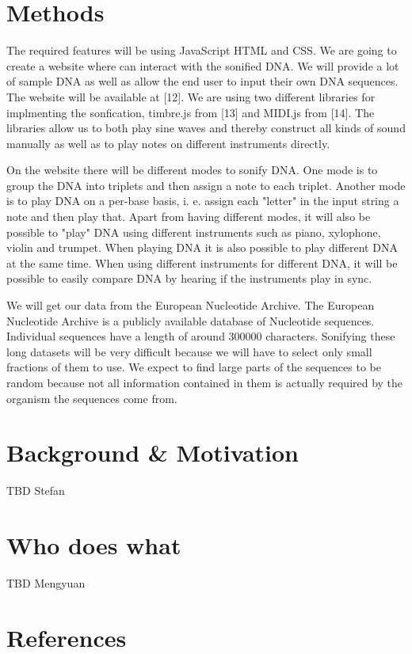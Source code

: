 \documentclass[12pt]{article}
\begin{document}
\section{Methods}

The required features will be using JavaScript HTML and CSS. We are going to create a website where can interact with the sonified DNA. We will provide a lot of sample DNA as well as allow the end user to input their own DNA sequences. The website will be available at [12]. We are using two different libraries for implmenting the sonfication, timbre.js from [13] and MIDI.js from [14]. The libraries allow us to both play sine waves and thereby construct all kinds of sound manually as well as to play notes on different instruments directly. 

On the website there will be different modes to sonify DNA. One mode is to group the DNA into triplets and then assign a note to each triplet. Another mode is to play DNA on a per-base basis, i. e. assign each "letter" in the input string a note and then play that. Apart from having different modes, it will also be possible to "play" DNA using different instruments such as piano, xylophone, violin and trumpet. When playing DNA it is also possible to play different DNA at the same time. When using different instruments for different DNA, it will be possible to easily compare DNA by hearing if the instruments play in sync. 

We will get our data from the European Nucleotide Archive. The European Nucleotide Archive is a publicly available database of Nucleotide sequences. Individual sequences have a length of around 300000 characters. Sonifying these long datasets will be very difficult because we will have to select only small fractions of them to use. We expect to find large parts of the sequences to be random because not all information contained in them is actually required by the organism the sequences come from.  

\section{Background \& Motivation}

TBD Stefan

\section{Who does what}

TBD Mengyuan

\section{References}
\end{document}
